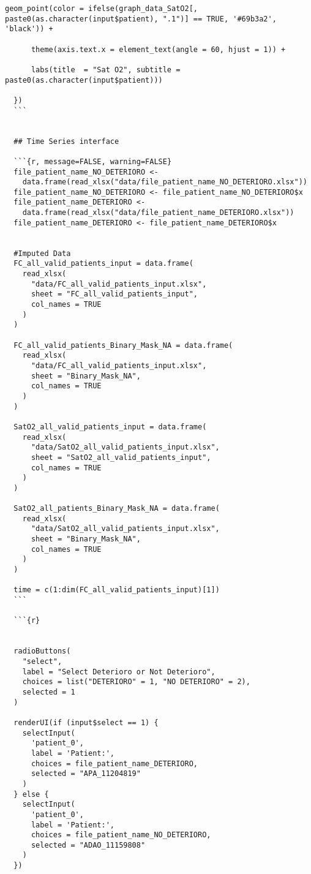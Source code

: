 \begin{lstlisting}[style=mystyle,caption={Código Visualización de los Datos}, label={lst:codigo-visualizacion}]
      geom_point(color = ifelse(graph_data_SatO2[, paste0(as.character(input$patient), ".1")] == TRUE, '#69b3a2', 'black')) +
      
      theme(axis.text.x = element_text(angle = 60, hjust = 1)) +
      
      labs(title  = "Sat O2", subtitle = paste0(as.character(input$patient)))
    
  })
  ```
  
  
  ## Time Series interface
  
  ```{r, message=FALSE, warning=FALSE}
  file_patient_name_NO_DETERIORO <-
    data.frame(read_xlsx("data/file_patient_name_NO_DETERIORO.xlsx"))
  file_patient_name_NO_DETERIORO <- file_patient_name_NO_DETERIORO$x
  file_patient_name_DETERIORO <-
    data.frame(read_xlsx("data/file_patient_name_DETERIORO.xlsx"))
  file_patient_name_DETERIORO <- file_patient_name_DETERIORO$x
  
  
  #Imputed Data
  FC_all_valid_patients_input = data.frame(
    read_xlsx(
      "data/FC_all_valid_patients_input.xlsx",
      sheet = "FC_all_valid_patients_input",
      col_names = TRUE
    )
  )
  
  FC_all_valid_patients_Binary_Mask_NA = data.frame(
    read_xlsx(
      "data/FC_all_valid_patients_input.xlsx",
      sheet = "Binary_Mask_NA",
      col_names = TRUE
    )
  )
  
  SatO2_all_valid_patients_input = data.frame(
    read_xlsx(
      "data/SatO2_all_valid_patients_input.xlsx",
      sheet = "SatO2_all_valid_patients_input",
      col_names = TRUE
    )
  )
  
  SatO2_all_patients_Binary_Mask_NA = data.frame(
    read_xlsx(
      "data/SatO2_all_valid_patients_input.xlsx",
      sheet = "Binary_Mask_NA",
      col_names = TRUE
    )
  )
  
  time = c(1:dim(FC_all_valid_patients_input)[1])
  ```
  
  ```{r}
  
  
  radioButtons(
    "select",
    label = "Select Deterioro or Not Deterioro",
    choices = list("DETERIORO" = 1, "NO DETERIORO" = 2),
    selected = 1
  )
  
  renderUI(if (input$select == 1) {
    selectInput(
      'patient_0',
      label = 'Patient:',
      choices = file_patient_name_DETERIORO,
      selected = "APA_11204819"
    )
  } else {
    selectInput(
      'patient_0',
      label = 'Patient:',
      choices = file_patient_name_NO_DETERIORO,
      selected = "ADAO_11159808"
    )
  })
  

\end{lstlisting}
